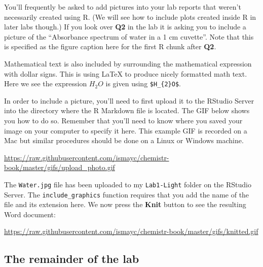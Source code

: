 \documentclass[]{tufte-book}
\begin{document}
You'll frequently be asked to add pictures into your lab reports that
weren't necessarily created using R. (We will see how to include plots
created inside R in later labs though.) If you look over \textbf{Q2} in
the lab it is asking you to include a picture of the ``Absorbance
spectrum of water in a 1 cm cuvette''. Note that this is specified as
the figure caption here for the first R chunk after \textbf{Q2}.

Mathematical text is also included by surrounding the mathematical
expression with dollar signs. This is using LaTeX to produce nicely
formatted math text. Here we see the expression \(H_{2}O\) is given
using \texttt{\$H\_\{2\}O\$}.

In order to include a picture, you'll need to first upload it to the
RStudio Server into the directory where the R Markdown file is located.
The GIF below shows you how to do so. Remember that you'll need to know
where you saved your image on your computer to specify it here. This
example GIF is recorded on a Mac but similar procedures should be done
on a Linux or Windows machine.

\vspace{0.1in}

\begin{center}\footnotesize{\url{https://raw.githubusercontent.com/ismayc/chemistr-book/master/gifs/upload_photo.gif}}\end{center}

\vspace{0.1in}

The \texttt{Water.jpg} file has been uploaded to my \texttt{Lab1-Light}
folder on the RStudio Server. The \texttt{include\_graphics} function
requires that you add the name of the file and its extension here. We
now press the \textbf{Knit} button to see the resulting Word document:

\vspace{0.1in}

\begin{center}\footnotesize{\url{https://raw.githubusercontent.com/ismayc/chemistr-book/master/gifs/knitted.gif}}\end{center}

\vspace{0.1in}

\subsection{The remainder of the lab}\label{the-remainder-of-the-lab}
\end{document}
